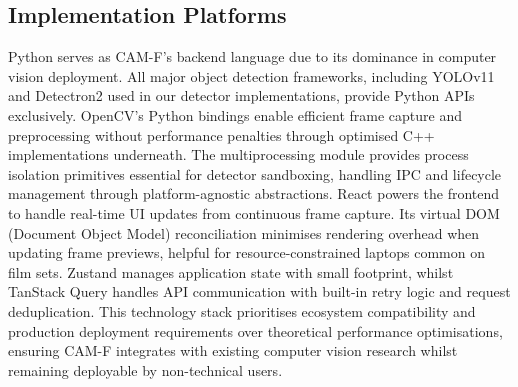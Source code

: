\subsection{Implementation Platforms}
Python serves as CAM-F's backend language due to its dominance in computer vision deployment. All major object detection frameworks, including YOLOv11 and Detectron2 used in our detector implementations, provide Python APIs exclusively. OpenCV's Python bindings enable efficient frame capture and preprocessing without performance penalties through optimised C++ implementations underneath. The multiprocessing module provides process isolation primitives essential for detector sandboxing, handling IPC and lifecycle management through platform-agnostic abstractions.
React powers the frontend to handle real-time UI updates from continuous frame capture. Its virtual DOM (Document Object Model) reconciliation minimises rendering overhead when updating frame previews, helpful for resource-constrained laptops common on film sets. Zustand manages application state with small footprint, whilst TanStack Query handles API communication with built-in retry logic and request deduplication. This technology stack prioritises ecosystem compatibility and production deployment requirements over theoretical performance optimisations, ensuring CAM-F integrates with existing computer vision research whilst remaining deployable by non-technical users.
